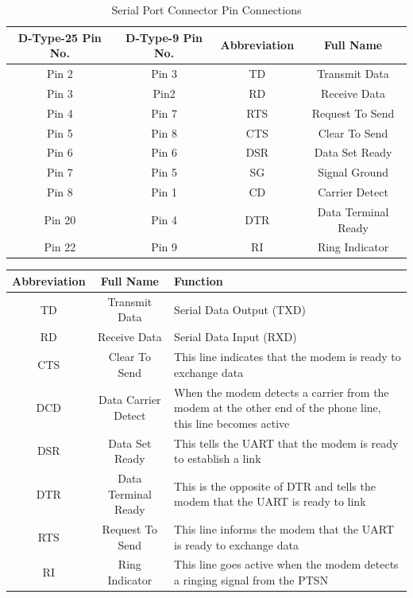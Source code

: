 \documentclass[a4paper,28pt,twoside,openright]{report}
\begin{document}
\begin{table}[h]
\centering
\bgroup
\def\arraystretch{1.5}
\begin{tabular}{|c|c|c|c|}
\hline
\textbf{D-Type-25 Pin No.}  & \textbf{D-Type-9 Pin No.}  & \textbf{Abbreviation} & \textbf{Full Name}  \\ \hline
Pin 2 & Pin 3 & TD & Transmit Data \\ \hline
Pin 3 & Pin2  & RD & Receive Data\\ \hline
Pin 4 & Pin 7 & RTS & Request To Send     \\ \hline
Pin 5 & Pin 8 & CTS & Clear To Send       \\ \hline
Pin 6 & Pin 6 & DSR & Data Set Ready      \\ \hline
Pin 7 & Pin 5 & SG & Signal Ground       \\ \hline
Pin 8 & Pin 1 & CD & Carrier Detect      \\ \hline
Pin 20 & Pin 4 & DTR & Data Terminal Ready \\ \hline
Pin 22 & Pin 9 & RI&   Ring Indicator\\ \hline
\end{tabular}
\caption{Serial Port Connector Pin Connections}
\egroup
\end{table}
%
%
%
\newpage
\begin{table}[h]
\centering
\bgroup
\def\arraystretch{1.5}
\begin{tabular}{|c|c|p{7cm}|}
\hline
\textbf{Abbreviation} & \textbf{Full Name}  & \textbf{Function}\\
\hline
TD & Transmit Data & Serial Data Output (TXD)\\
\hline
RD  & Receive Data & Serial Data Input (RXD) \\
\hline
CTS & Clear To Send & This line indicates that the modem is ready to exchange data \\ \hline
DCD & Data Carrier Detect & When the modem detects a carrier from the modem at the other end of the phone line, this line becomes active \\
\hline
DSR & Data Set Ready & This tells the UART that the modem is ready to establish a link\\                                             \hline
DTR & Data Terminal Ready & This is the opposite of DTR and tells the modem that the UART is ready to link\\
\hline
RTS & Request To Send & This line informs the modem that the UART is ready to exchange data\\
\hline
RI & Ring Indicator & This line goes active when the modem detects a ringing signal from the PTSN\\
\hline
\end{tabular}
\egroup
\end{table}
%
\end{document}
